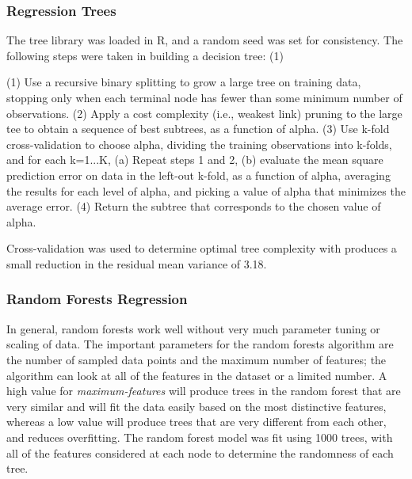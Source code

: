 \documentclass[sigconf]{acmart}
\begin{document}
\subsubsection{Regression Trees} 

The tree library was loaded in R, and a random seed was set for consistency. 
The following steps were taken in building a decision tree: (1) 

 (1) Use a recursive binary 
splitting to grow a large tree on training data, stopping only when each 
terminal node has fewer than some minimum number of observations. (2) Apply 
a cost complexity (i.e., weakest link) pruning  to the large tee to obtain 
a sequence of best subtrees, as a function of alpha. (3) Use k-fold 
cross-validation to choose alpha, dividing the training observations into 
k-folds, and for each k=1...K, (a) Repeat steps 1 and 2, (b) evaluate the 
mean square prediction error on data in the left-out k-fold, as a function 
of alpha, averaging the results for each level of alpha, and picking a value 
of alpha that minimizes the average error. (4) Return the subtree that 
corresponds to the chosen value of alpha. 

Cross-validation was used to determine optimal tree complexity with produces 
a small reduction in the residual mean variance of 3.18. 



\subsubsection{Random Forests Regression} 

In general, random forests work well without very much parameter tuning or 
scaling of data. The important parameters for the random forests algorithm are 
the number of sampled data points and the maximum number of features; the 
algorithm can look at all of the features in the dataset or a limited number. 
A high value for \emph{maximum-features} will produce trees in the random 
forest that are very similar and will fit the data easily based on the most 
distinctive features, whereas a low value will produce trees that are very 
different from each other, and reduces overfitting. The random forest model 
was fit using 1000 trees, with all of the features considered at each node 
to determine the randomness of each tree. 

\end{document}
